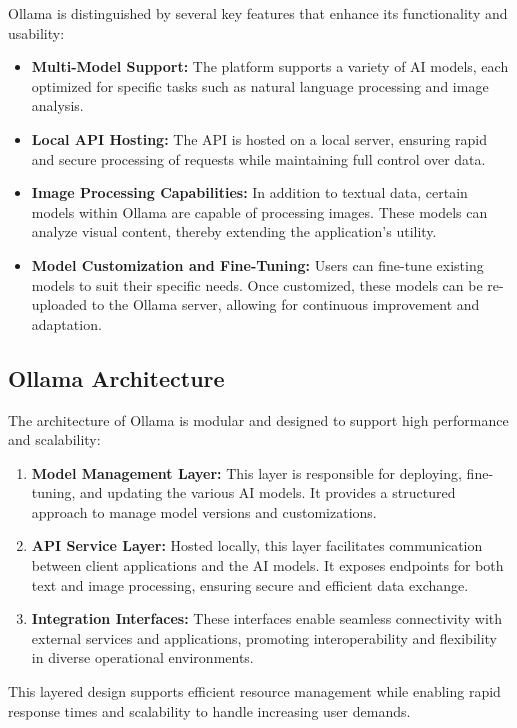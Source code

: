 Ollama is distinguished by several key features that enhance its functionality and usability:
\begin{itemize}
  \item \textbf{Multi-Model Support:} The platform supports a variety of AI models, each optimized for specific tasks such as natural language processing and image analysis.
  \item \textbf{Local API Hosting:} The API is hosted on a local server, ensuring rapid and secure processing of requests while maintaining full control over data.
  \item \textbf{Image Processing Capabilities:} In addition to textual data, certain models within Ollama are capable of processing images. These models can analyze visual content, thereby extending the application’s utility.
  \item \textbf{Model Customization and Fine-Tuning:} Users can fine-tune existing models to suit their specific needs. Once customized, these models can be re-uploaded to the Ollama server, allowing for continuous improvement and adaptation.
\end{itemize}

\subsection{Ollama Architecture}

The architecture of Ollama is modular and designed to support high performance and scalability:
\begin{enumerate}
  \item \textbf{Model Management Layer:} This layer is responsible for deploying, fine-tuning, and updating the various AI models. It provides a structured approach to manage model versions and customizations.
  \item \textbf{API Service Layer:} Hosted locally, this layer facilitates communication between client applications and the AI models. It exposes endpoints for both text and image processing, ensuring secure and efficient data exchange.
  \item \textbf{Integration Interfaces:} These interfaces enable seamless connectivity with external services and applications, promoting interoperability and flexibility in diverse operational environments.
\end{enumerate}
This layered design supports efficient resource management while enabling rapid response times and scalability to handle increasing user demands.

